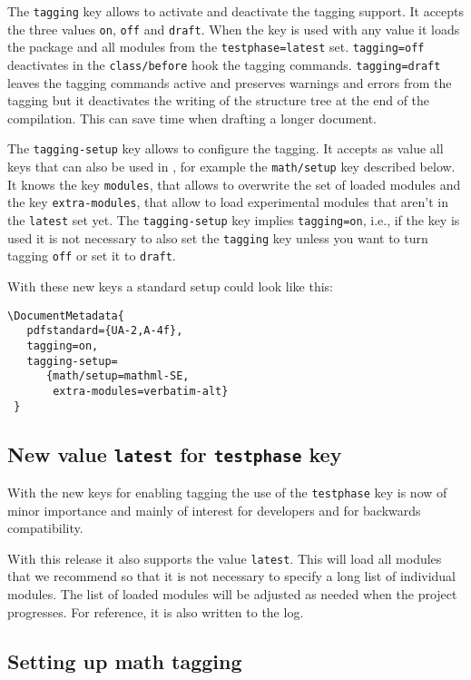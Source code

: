 \documentclass{ltnews}
\begin{document}
The \texttt{tagging} key allows to activate and deactivate the tagging
support.  It accepts the three values \texttt{on}, \texttt{off} and
\texttt{draft}.  When the key is used with any value it loads the
 package and all modules from the
\texttt{testphase=latest} set. \texttt{tagging=off} deactivates in the
\texttt{class/before} hook the tagging
commands. \texttt{tagging=draft} leaves the tagging commands active
and preserves warnings and errors from the tagging but it deactivates
the writing of the structure tree at the end of the compilation. This
can save time when drafting a longer document.

The \texttt{tagging-setup} key allows to configure the tagging.  It
accepts as value all keys that can also be used in ,
for example the \texttt{math/setup} key described below. It knows the
key \texttt{modules}, that allows to overwrite the set of loaded
modules and the key \texttt{extra-modules}, that allow to load
experimental modules that aren't in the \texttt{latest} set yet.
%
The \texttt{tagging-setup} key implies \texttt{tagging=on}, i.e., if
the key is used it is not necessary to also set the \texttt{tagging}
key unless you want to turn tagging \texttt{off} or set it to
\texttt{draft}.

With these new keys a standard setup could look like this:
\begin{verbatim}
\DocumentMetadata{
   pdfstandard={UA-2,A-4f},
   tagging=on,
   tagging-setup=
      {math/setup=mathml-SE,
       extra-modules=verbatim-alt}
 }      
\end{verbatim}


\subsection{New value \texttt{latest} for \texttt{testphase} key}

With the new keys for enabling tagging the use of the
\texttt{testphase} key is now of minor importance and mainly of
interest for developers and for backwards compatibility.

With this release it also supports the value \texttt{latest}.  This
will load all modules that we recommend so that it is not necessary to
specify a long list of individual modules. The list of loaded modules
will be adjusted as needed when the project progresses. For reference,
it is also written to the log.



\subsection{Setting up math tagging}
\end{document}

